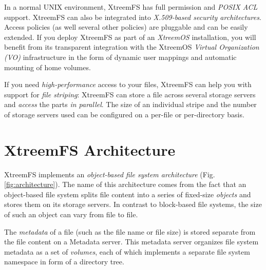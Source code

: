 \documentclass[a4paper,10pt]{book}
\begin{document}
In a normal UNIX environment, XtreemFS has full permission and \emph{POSIX ACL} support. XtreemFS can also be integrated into \emph{X.509-based security architectures}. Access policies (as well several other policies) are pluggable and can be easily extended. If you deploy XtreemFS as part of an \emph{XtreemOS} installation, you will benefit from its transparent integration with the XtreemOS \emph{Virtual Organization (VO)} infrastructure in the form of dynamic user mappings and automatic mounting of home volumes.

If you need \emph{high-performance} access to your files, XtreemFS can help you with support for \emph{file striping}: XtreemFS can store a file across several storage servers and \emph{access} the parts \emph{in parallel}. The size of an individual stripe and the number of storage servers used can be configured on a per-file or per-directory basis.


\section{XtreemFS Architecture}

XtreemFS implements an \emph{object-based file system architecture} (Fig. \ref{fig:architecture}). The name of this architecture comes from the fact that an object-based file system splits file content into a series of fixed-size \emph{objects} and stores them on its storage servers. In contrast to block-based file systems, the size of such an object can vary from file to file.

The \emph{metadata} of a file (such as the file name or file size) is stored separate from the file content on a Metadata server. This metadata server organizes file system metadata as a set of \emph{volumes}, each of which implements a separate file system namespace in form of a directory tree.

\end{document}
